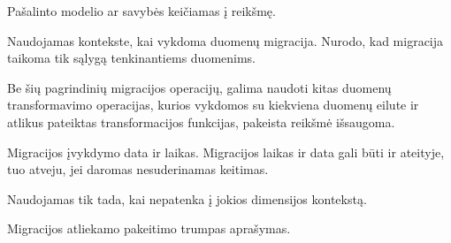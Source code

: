 \documentclass[letterpaper,10pt,lithuanian]{sphinxmanual}
\begin{document}
\begin{fulllineitems}
\begin{fulllineitems}
\sphinxAtStartPar
Pašalinto modelio ar savybės {\hyperref[\detokenize{tipai:module-type}]{}} keičiamas į 
reikšmę.

\end{fulllineitems}


\begin{fulllineitems}
\label{\detokenize{dimensijos:migrate.filter}}
\pysigstartsignatures
\pysiglinewithargsret
{}
{}
{}
\pysigstopsignatures
\sphinxAtStartPar
Naudojamas {\hyperref[\detokenize{formatas:property}]{}} kontekste, kai vykdoma duomenų
migracija. Nurodo, kad migracija taikoma tik  sąlygą
tenkinantiems duomenims.

\end{fulllineitems}


\sphinxAtStartPar
Be šių pagrindinių migracijos operacijų, galima naudoti kitas duomenų
transformavimo operacijas, kurios vykdomos su kiekviena duomenų eilute
ir atlikus pateiktas transformacijos funkcijas, pakeista reikšmė
išsaugoma.

\end{fulllineitems}


\begin{fulllineitems}
\label{\detokenize{dimensijos:migrate.title}}
\pysigstartsignatures
\pysigline
{}
\pysigstopsignatures
\sphinxAtStartPar
Migracijos įvykdymo data ir laikas. Migracijos laikas ir data gali
būti ir ateityje, tuo atveju, jei daromas nesuderinamas keitimas.

\sphinxAtStartPar
Naudojamas tik tada, kai {\hyperref[\detokenize{dimensijos:module-migrate}]{}} nepatenka į jokios dimensijos
kontekstą.

\end{fulllineitems}


\begin{fulllineitems}
\label{\detokenize{dimensijos:migrate.description}}
\pysigstartsignatures
\pysigline
{}
\pysigstopsignatures
\sphinxAtStartPar
Migracijos atliekamo pakeitimo trumpas aprašymas.

\end{fulllineitems}
\end{document}
